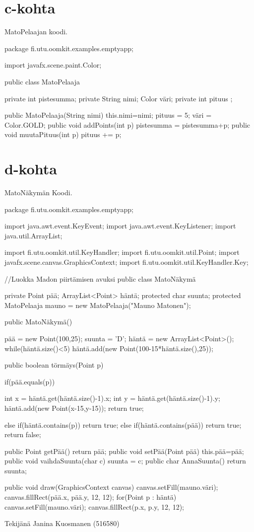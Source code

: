\section{c-kohta}
\label{c-kohta}
MatoPelaajan koodi.
\begin{javacode}
package fi.utu.oomkit.examples.emptyapp;

import javafx.scene.paint.Color;

public class MatoPelaaja {
	
	private int pistesumma;
	private String nimi;
	 Color väri;
	private int pituus ;
	
	public MatoPelaaja(String nimi) {
		this.nimi=nimi;
		pituus = 5;
		väri = Color.GOLD;
	}
	public void addPoints(int p) {
		pistesumma = pistesumma+p;
	}
	public void muutaPituus(int p) {
		pituus += p;
	}

}

\end{javacode}

\section{d-kohta}
\label{d-kohta}

MatoNäkymän Koodi.

\begin{javacode}
package fi.utu.oomkit.examples.emptyapp;

import java.awt.event.KeyEvent;
import java.awt.event.KeyListener;
import java.util.ArrayList;

import fi.utu.oomkit.util.KeyHandler;
import fi.utu.oomkit.util.Point;
import javafx.scene.canvas.GraphicsContext;
import fi.utu.oomkit.util.KeyHandler.Key;

//Luokka Madon piirtämisen avuksi
public class MatoNäkymä   {
	private Point pää;
	ArrayList<Point> häntä;
	protected char suunta;
	protected MatoPelaaja mauno = new MatoPelaaja("Mauno Matonen");
	
	public MatoNäkymä() {
		pää = new Point(100,25);
		suunta = 'D';
		häntä = new ArrayList<Point>();
		while(häntä.size()<5) {
			häntä.add(new Point(100-15*häntä.size(),25));}
		
	}
	public boolean törmäys(Point p) {
		if(pää.equals(p)) {

			int x = häntä.get(häntä.size()-1).x;
			int y = häntä.get(häntä.size()-1).y;
			häntä.add(new Point(x-15,y-15));
			return true;
		}else if(häntä.contains(p)) {return true;}
		else if(häntä.contains(pää)) {return true;}
		return false;
		}
	public Point getPää() {
		return pää;
	}
	public void setPää(Point pää) {
		this.pää=pää;
	}
	public void vaihdaSuunta(char c) {
		suunta = c;
	}
	public char AnnaSuunta() {
		return suunta;
	}
	
	public void draw(GraphicsContext canvas) {
		canvas.setFill(mauno.väri);
        canvas.fillRect(pää.x, pää.y, 12, 12);
        for(Point p : häntä) {
        	canvas.setFill(mauno.väri);
            canvas.fillRect(p.x, p.y, 12, 12);
        }
	}

}


\end{javacode}







Tekijänä Janina Kuosmanen (516580)
